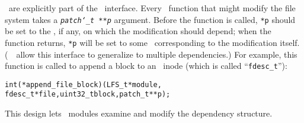 \Patches\ are explicitly part of the \LFS\ interface.
%
Every \LFS\ function that might modify the file system takes a
\texttt{\textit{patch\char`\_t **p}} argument.
%
Before the function is called, \texttt{*p} should be set to the \patch,
if any, on which the modification should depend;
%
when the function returns, \texttt{*p} will be set to some \patch\
corresponding to the modification itself.
%
(\Noop\ \patches\ allow this interface to generalize to multiple
dependencies.)
%
For example, this function is called to append a block to an \LFS\ inode
(which is called ``\verb+fdesc_t+''):

\begin{small}
\begin{alltt}
int (*append_file_block)(LFS_t *module, 
   fdesc_t *file, uint32_t block, patch_t **p);
\end{alltt}
\end{small}

\noindent%
This design lets \LFS\ modules examine and modify the dependency structure.
